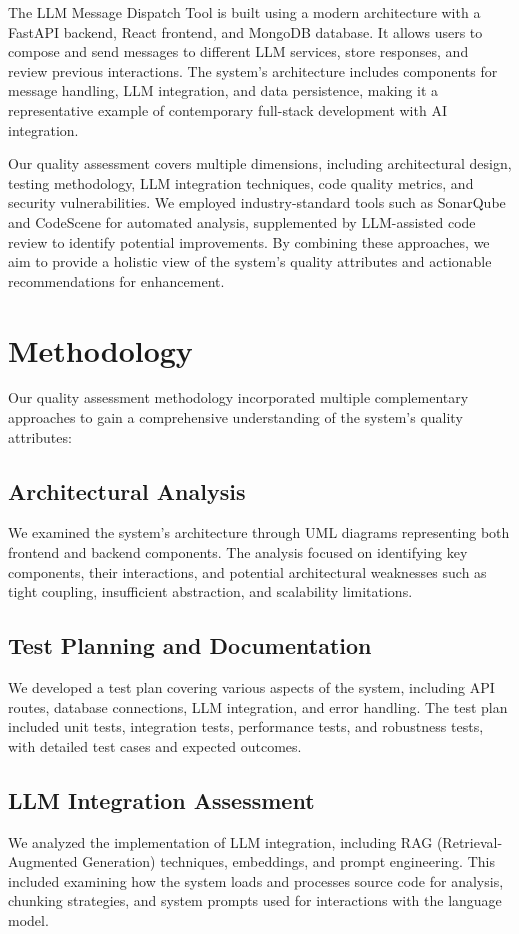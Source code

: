 \documentclass[sigconf]{acmart}
\begin{document}
The LLM Message Dispatch Tool is built using a modern architecture with a FastAPI backend, React frontend, and MongoDB database. It allows users to compose and send messages to different LLM services, store responses, and review previous interactions. The system's architecture includes components for message handling, LLM integration, and data persistence, making it a representative example of contemporary full-stack development with AI integration.

Our quality assessment covers multiple dimensions, including architectural design, testing methodology, LLM integration techniques, code quality metrics, and security vulnerabilities. We employed industry-standard tools such as SonarQube and CodeScene for automated analysis, supplemented by LLM-assisted code review to identify potential improvements. By combining these approaches, we aim to provide a holistic view of the system's quality attributes and actionable recommendations for enhancement.

\section{Methodology}
Our quality assessment methodology incorporated multiple complementary approaches to gain a comprehensive understanding of the system's quality attributes:

\subsection{Architectural Analysis}
We examined the system's architecture through UML diagrams representing both frontend and backend components. The analysis focused on identifying key components, their interactions, and potential architectural weaknesses such as tight coupling, insufficient abstraction, and scalability limitations.

\subsection{Test Planning and Documentation}
We developed a test plan covering various aspects of the system, including API routes, database connections, LLM integration, and error handling. The test plan included unit tests, integration tests, performance tests, and robustness tests, with detailed test cases and expected outcomes.

\subsection{LLM Integration Assessment}
We analyzed the implementation of LLM integration, including RAG (Retrieval-Augmented Generation) techniques, embeddings, and prompt engineering. This included examining how the system loads and processes source code for analysis, chunking strategies, and system prompts used for interactions with the language model.
\end{document}
